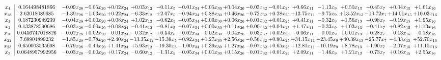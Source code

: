 \documentclass[9pt]{article}
\begin{document}
 \[\begin{array}{c| c c@{\hskip 2pt} c@{\hskip 2pt} c@{\hskip 2pt} c@{\hskip 2pt} c@{\hskip 2pt} c@{\hskip 2pt} c@{\hskip 2pt} c@{\hskip 2pt} c@{\hskip 2pt} c@{\hskip 2pt} c@{\hskip 2pt} c@{\hskip 2pt} c@{\hskip 2pt} c@{\hskip 2pt} c@{\hskip 2pt} c@{\hskip 2pt} }
 x_{4}   &  0.164498481866 & -0.09 x_{28} & -0.05 x_{20} & +  0.02 x_{24} & +  0.03 x_{12} & -0.11 x_{5} & -0.01 x_{34} & +  0.05 x_{30} & +  0.04 x_{26} & -0.03 x_{32} & -0.01 x_{25} & +  0.66 x_{11} & -1.13 x_{9} & +  0.50 x_{13} & -0.45 x_{7} & +  0.04 x_{15} & +  1.61 x_{16}\\
 x_{18}   &  2.62018089685 & -1.39 x_{28} & -1.03 x_{20} & +  0.22 x_{24} & -6.33 x_{12} & +  2.07 x_{5} & -0.94 x_{34} & +  0.88 x_{30} & +  0.46 x_{26} & -0.72 x_{32} & +  0.28 x_{25} & + 13.75 x_{11} & -9.75 x_{9} & + 13.52 x_{13} & -10.72 x_{7} & + 14.01 x_{15} & + 10.03 x_{16}\\
 x_{1}   &  0.187230949239 & -0.04 x_{28} & +  0.00 x_{20} & +  0.08 x_{24} & +  1.02 x_{12} & -0.62 x_{5} & -0.05 x_{34} & +  0.09 x_{30} & +  0.06 x_{26} & +  0.01 x_{32} & +  0.01 x_{25} & +  0.41 x_{11} & -0.32 x_{9} & +  1.56 x_{13} & -0.98 x_{7} & -0.19 x_{15} & +  1.95 x_{16}\\
 x_{2}   &  0.133878590686 & -0.03 x_{28} & -0.00 x_{20} & +  0.08 x_{24} & -0.41 x_{12} & -0.81 x_{5} & -0.07 x_{34} & +  0.00 x_{30} & +  0.11 x_{26} & +  0.00 x_{32} & +  0.04 x_{25} & +  1.47 x_{11} & -0.33 x_{9} & +  1.03 x_{13} & -0.41 x_{7} & +  0.82 x_{15} & +  1.13 x_{16}\\
 x_{10}   &  0.0456747018826 & -0.02 x_{28} & +  0.02 x_{20} & -0.01 x_{24} & -0.32 x_{12} & +  0.54 x_{5} & +  0.02 x_{34} & -0.02 x_{30} & -0.04 x_{26} & -0.03 x_{32} & +  0.02 x_{25} & -0.06 x_{11} & -0.01 x_{9} & +  0.01 x_{13} & +  0.28 x_{7} & -0.13 x_{15} & -0.18 x_{16}\\
 x_{22}   &  7.69904899232 & -1.85 x_{28} & -0.78 x_{20} & +  2.40 x_{24} & -13.35 x_{12} & -15.39 x_{5} & -0.92 x_{34} & +  1.27 x_{30} & +  2.56 x_{26} & -0.56 x_{32} & +  0.90 x_{25} & + 34.15 x_{11} & -23.45 x_{9} & + 40.39 x_{13} & -25.77 x_{7} & -4.33 x_{15} & + 52.70 x_{16}\\
 x_{23}   &  0.650003535698 & -0.79 x_{28} & -0.44 x_{20} & +  1.41 x_{24} & +  5.93 x_{12} & -19.30 x_{5} & -1.00 x_{34} & +  0.39 x_{30} & +  1.27 x_{26} & -0.07 x_{32} & +  0.65 x_{25} & + 12.81 x_{11} & -10.19 x_{9} & +  8.78 x_{13} & +  1.90 x_{7} & -2.07 x_{15} & + 11.15 x_{16}\\
 x_{3}   &  0.0648957992956 & -0.03 x_{28} & -0.00 x_{20} & +  0.17 x_{24} & -0.60 x_{12} & -1.31 x_{5} & -0.05 x_{34} & +  0.01 x_{30} & +  0.15 x_{26} & -0.01 x_{32} & +  0.01 x_{25} & +  2.09 x_{11} & -1.46 x_{9} & +  1.21 x_{13} & -0.73 x_{7} & +  0.16 x_{15} & +  2.55 x_{16}\\

\end{array}\]
\end{document}
